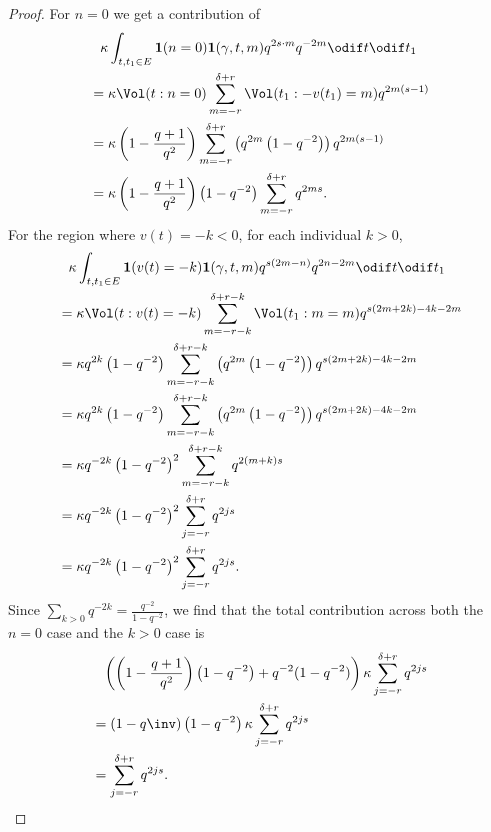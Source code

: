 \begin{proof}
  For $n = 0$ we get a contribution of
  \begin{align*}
    &\phantom= \kappa \int_{t, t_1 \in E} \mathbf{1}(n=0) \mathbf{1}(\gamma,t,m)
      q^{2s \cdot m} q^{-2m} \odif t \odif t_1 \\
    &= \kappa \Vol(t: n =0) \sum_{m=-r}^{\delta+r} \Vol(t_1: -v(t_1)=m) q^{2m(s-1)} \\
    &= \kappa \left( 1 - \frac{q+1}{q^2} \right) \sum_{m=-r}^{\delta+r}
    \left( q^{2m} \left( 1-q^{-2} \right) \right) q^{2m(s-1)} \\
    &= \kappa \left( 1 - \frac{q+1}{q^2} \right) \left( 1-q^{-2} \right)
    \sum_{m=-r}^{\delta+r} q^{2ms}.
  \end{align*}
  For the region where $v(t) = -k < 0$, for each individual $k > 0$,
  \begin{align*}
    &\phantom= \kappa \int_{t, t_1 \in E} \mathbf{1}(v(t)=-k) \mathbf{1}(\gamma,t,m)
      q^{s(2m-n)} q^{2n-2m} \odif t \odif t_1 \\
    &= \kappa \Vol(t: v(t)=-k) \sum_{m=-r-k}^{\delta+r-k}
      \Vol(t_1: m=m) q^{s(2m+2k)-4k-2m} \\
    &= \kappa q^{2k} \left( 1 - q^{-2} \right) \sum_{m=-r-k}^{\delta+r-k}
      \left( q^{2m} \left( 1-q^{-2} \right) \right) q^{s(2m+2k)-4k-2m} \\
    &= \kappa q^{2k} \left( 1 - q^{-2} \right) \sum_{m=-r-k}^{\delta+r-k}
      \left( q^{2m} \left( 1-q^{-2} \right) \right) q^{s(2m+2k)-4k-2m} \\
    &= \kappa q^{-2k} \left( 1 - q^{-2} \right)^2
      \sum_{m=-r-k}^{\delta+r-k} q^{2(m+k)s} \\
    &= \kappa q^{-2k} \left( 1 - q^{-2} \right)^2 \sum_{j=-r}^{\delta+r} q^{2js} \\
    &= \kappa q^{-2k} \left( 1 - q^{-2} \right)^2 \sum_{j=-r}^{\delta+r} q^{2js}.
  \end{align*}
  Since $\sum_{k > 0} q^{-2k} = \frac{q^{-2}}{1-q^{-2}}$,
  we find that the total contribution across both
  the $n=0$ case and the $k > 0$ case is
  \begin{align*}
    &\phantom= \left( \left( 1 - \frac{q+1}{q^2} \right) \left( 1-q^{-2} \right)
      + q^{-2}(1-q^{-2})  \right) \kappa \sum_{j=-r}^{\delta+r} q^{2js} \\
    &= \left( 1-q\inv \right) \left(1-q^{-2} \right)
      \kappa \sum_{j=-r}^{\delta+r} q^{2js} \\
    &= \sum_{j=-r}^{\delta+r} q^{2js}. \qedhere
  \end{align*}
\end{proof}

